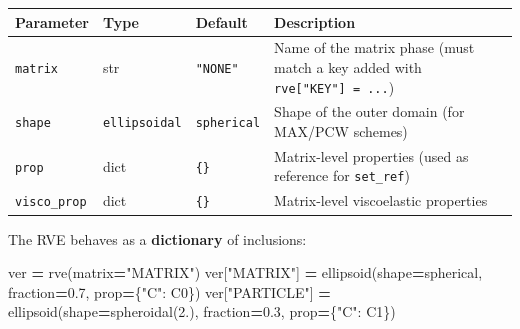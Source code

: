 \documentclass[
  a4paper,
  numbers=noendperiod,
  DIV=12]{scrreprt}
\newenvironment{Shaded}{\begin{snugshade}}{\end{snugshade}}
\newcommand{\FloatTok}[1]{\textcolor[rgb]{0.00,0.00,0.81}{#1}}
\newcommand{\NormalTok}[1]{#1}
\newcommand{\OperatorTok}[1]{\textcolor[rgb]{0.81,0.36,0.00}{\textbf{#1}}}
\newcommand{\StringTok}[1]{\textcolor[rgb]{0.31,0.60,0.02}{#1}}
\newcounter{none} %
\begin{document}
{\def\LTcaptype{none} %
\begin{longtable}[]{@{}
  >{\raggedright\arraybackslash}p{}
  >{\raggedright\arraybackslash}p{}
  >{\raggedright\arraybackslash}p{}
  >{\raggedright\arraybackslash}p{}@{}}
\toprule\noalign{}
\begin{minipage}[b]{\linewidth}\raggedright
Parameter
\end{minipage} & \begin{minipage}[b]{\linewidth}\raggedright
Type
\end{minipage} & \begin{minipage}[b]{\linewidth}\raggedright
Default
\end{minipage} & \begin{minipage}[b]{\linewidth}\raggedright
Description
\end{minipage} \\
\midrule\noalign{}
\endhead
\bottomrule\noalign{}
\endlastfoot
\texttt{matrix} & str & \texttt{"NONE"} & Name of the matrix phase (must
match a key added with \texttt{rve{[}"KEY"{]}\ =\ ...}) \\
\texttt{shape} & \texttt{ellipsoidal} & \texttt{spherical} & Shape of
the outer domain (for MAX/PCW schemes) \\
\texttt{prop} & dict & \texttt{\{\}} & Matrix-level properties (used as
reference for \texttt{set\_ref}) \\
\texttt{visco\_prop} & dict & \texttt{\{\}} & Matrix-level viscoelastic
properties \\
\end{longtable}
}

The RVE behaves as a \textbf{dictionary} of inclusions:

\begin{Shaded}
\begin{Highlighting}[]
\NormalTok{ver }\OperatorTok{=}\NormalTok{ rve(matrix}\OperatorTok{=}\StringTok{"MATRIX"}\NormalTok{)}
\NormalTok{ver[}\StringTok{"MATRIX"}\NormalTok{]   }\OperatorTok{=}\NormalTok{ ellipsoid(shape}\OperatorTok{=}\NormalTok{spherical, fraction}\OperatorTok{=}\FloatTok{0.7}\NormalTok{, prop}\OperatorTok{=}\NormalTok{\{}\StringTok{"C"}\NormalTok{: C0\})}
\NormalTok{ver[}\StringTok{"PARTICLE"}\NormalTok{] }\OperatorTok{=}\NormalTok{ ellipsoid(shape}\OperatorTok{=}\NormalTok{spheroidal(}\FloatTok{2.}\NormalTok{), fraction}\OperatorTok{=}\FloatTok{0.3}\NormalTok{, prop}\OperatorTok{=}\NormalTok{\{}\StringTok{"C"}\NormalTok{: C1\})}
\end{Highlighting}
\end{Shaded}
\end{document}
